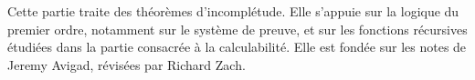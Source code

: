 \documentclass[../../include/open-logic-part]{subfiles}
\begin{document}
\begin{OLPartNotice}{}
Cette partie traite des théorèmes d'incomplétude. Elle s'appuie sur
la logique du premier ordre, notamment sur le système de preuve,
et sur les fonctions récursives étudiées dans la partie consacrée à
la calculabilité. Elle est fondée sur les notes de Jeremy Avigad,
révisées par Richard Zach.
\end{OLPartNotice}






\OLEndPartHook
\end{document}
